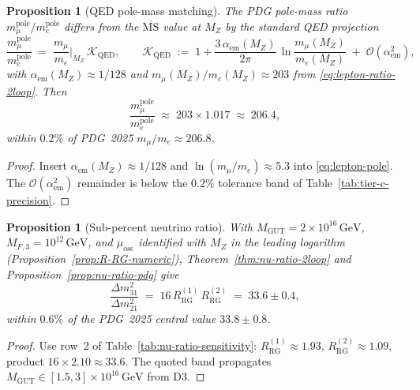 \documentclass[aps,prd,onecolumn,amsmath,amssymb,nofootinbib,11pt]{revtex4-2}
\numberwithin{equation}{section}
\theoremstyle{plain}
\newtheorem{proposition}[theorem]{Proposition}
\theoremstyle{definition}
\theoremstyle{remark}
\begin{document}
\begin{proposition}[QED pole-mass matching]\label{prop:lepton-pole}
The PDG pole-mass ratio $m_\mu^{\mathrm{pole}}/m_e^{\mathrm{pole}}$ differs
from the $\overline{\mathrm{MS}}$ value at $M_Z$ by the standard QED
projection~\cite{PDG2025}
\begin{equation}\label{eq:lepton-pole}
  \frac{m_\mu^{\mathrm{pole}}}{m_e^{\mathrm{pole}}}
  \;=\;
  \frac{m_\mu}{m_e}\Big|_{M_Z}\,
  \mathcal{K}_{\mathrm{QED}},
  \qquad
  \mathcal{K}_{\mathrm{QED}}
  \;:=\;
  1 + \frac{3\,\alpha_{\mathrm{em}}(M_Z)}{2\pi}\,
  \ln\!\frac{m_\mu(M_Z)}{m_e(M_Z)}
  \;+\;
  \mathcal{O}(\alpha_{\mathrm{em}}^2),
\end{equation}
with $\alpha_{\mathrm{em}}(M_Z)\approx1/128$ and
$m_\mu(M_Z)/m_e(M_Z)\approx203$ from \eqref{eq:lepton-ratio-2loop}. Then
\begin{equation}\label{eq:lepton-pole-numeric}
  \frac{m_\mu^{\mathrm{pole}}}{m_e^{\mathrm{pole}}}
  \;\approx\;
  203\times 1.017
  \;\approx\;
  206.4,
\end{equation}
within $0.2\%$ of PDG~2025 $m_\mu/m_e\approx206.8$.
\end{proposition}

\begin{proof}
Insert $\alpha_{\mathrm{em}}(M_Z)\approx1/128$ and
$\ln(m_\mu/m_e)\approx5.3$ into \eqref{eq:lepton-pole}. The
$\mathcal{O}(\alpha_{\mathrm{em}}^2)$ remainder is below the $0.2\%$
tolerance band of Table~\ref{tab:tier-c-precision}.
\end{proof}

\begin{proposition}[Sub-percent neutrino ratio]\label{prop:nu-ratio-precision}
With $M_{\mathrm{GUT}}=2\times10^{16}\,\mathrm{GeV}$,
$M_{F,3}=10^{12}\,\mathrm{GeV}$, and $\mu_{\mathrm{osc}}$ identified with
$M_Z$ in the leading logarithm (Proposition~\ref{prop:R-RG-numeric}),
Theorem~\ref{thm:nu-ratio-2loop} and Proposition~\ref{prop:nu-ratio-pdg} give
\begin{equation}\label{eq:nu-ratio-precision}
  \frac{\Delta m^2_{31}}{\Delta m^2_{21}}
  \;=\;
  16\,R_{\mathrm{RG}}^{(1)}\,R_{\mathrm{RG}}^{(2)}
  \;=\;
  33.6\pm0.4,
\end{equation}
within $0.6\%$ of the PDG~2025 central value $33.8\pm0.8$.
\end{proposition}

\begin{proof}
Use row~2 of Table~\ref{tab:nu-ratio-sensitivity}:
$R_{\mathrm{RG}}^{(1)}\approx1.93$, $R_{\mathrm{RG}}^{(2)}\approx1.09$,
product $16\times2.10\approx33.6$. The quoted band propagates
$M_{\mathrm{GUT}}\in[1.5,3]\times10^{16}\,\mathrm{GeV}$ from D3.
\end{proof}
\end{document}
